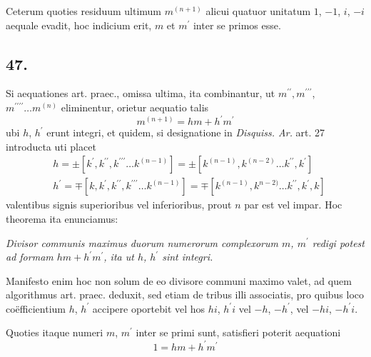 \documentclass[twoside,12pt]{memoir}
\begin{document}
Ceterum quoties residuum ultimum \(m^{(n+1)}\) alicui quatuor unitatum \(1\), \(-1\), \(i\), \(-i\) aequale evadit, hoc indicium erit, \(m\) et \(m^{\prime}\) inter se primos esse.

\subsection*{47.}
 
Si aequationes art. praec., omissa ultima, ita combinantur, ut \(m^{\prime \prime}, m^{\prime \prime \prime}\), \(m^{\prime \prime \prime \prime} \ldots m^{(n)}\) eliminentur, orietur aequatio talis
\[m^{(n+1)}=h m+h^{\prime} m^{\prime}\]\pagebreak%
ubi \(h\), \(h^{\prime}\) erunt integri, et quidem, si designatione in \textit{Disquiss. Ar.} art. 27 introducta uti placet
\[\begin{aligned}
& h= \pm\left[k^{\prime}, k^{\prime \prime}, k^{\prime \prime \prime} \ldots k^{(n-1)}\right]= \pm\left[k^{(n-1)}, k^{(n-2)} \ldots k^{\prime \prime}, k^{\prime}\right] \\
& h^{\prime}=\mp\left[k, k^{\prime}, k^{\prime \prime}, k^{\prime \prime \prime} \ldots k^{(n-1)}\right]=\mp\left[k^{(n-1)}, k^{n-2)} \ldots k^{\prime \prime}, k^{\prime}, k\right]
\end{aligned}\]
valentibus signis superioribus vel inferioribus, prout \(n\) par est vel impar. Hoc theorema ita enunciamus:
 
\textit{Divisor communis maximus duorum numerorum complexorum \(m\), \(m^{\prime}\) redigi potest ad formam \(h m+h^{\prime} m^{\prime}\), ita ut \(h\), \(h^{\prime}\) sint integri.}

Manifesto enim hoc non solum de eo divisore communi maximo valet, ad quem algorithmus art. praec. deduxit, sed etiam de tribus illi associatis, pro quibus loco coëfficientium \(h\), \(h^{\prime}\) accipere oportebit vel hos \(h i\), \(h^{\prime} i\) vel \(-h\), \(-h^{\prime}\), vel \(-h i\), \(-h^{\prime} i\).
 
Quoties itaque numeri \(m\), \(m^{\prime}\) inter se primi sunt, satisfieri poterit aequationi
\[1=h m+h^{\prime} m^{\prime}\]
\end{document}
